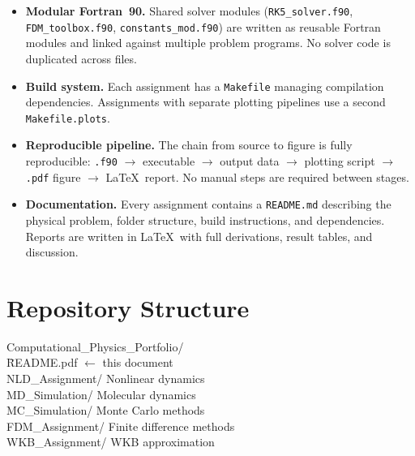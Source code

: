 \documentclass[11pt, a4paper]{article}
\begin{document}
\begin{itemize}[leftmargin=1.4em, itemsep=0.3em]

  \item \textbf{Modular Fortran~90.}
  Shared solver modules (\texttt{RK5\_solver.f90}, \texttt{FDM\_toolbox.f90},
  \texttt{constants\_mod.f90}) are written as reusable Fortran modules and
  linked against multiple problem programs. No solver code is duplicated across
  files.

  \item \textbf{Build system.}
  Each assignment has a \texttt{Makefile} managing compilation dependencies.
  Assignments with separate plotting pipelines use a second
  \texttt{Makefile.plots}.

  \item \textbf{Reproducible pipeline.}
  The chain from source to figure is fully reproducible:
  \texttt{.f90} $\to$ executable $\to$ output data $\to$ plotting script
  $\to$ \texttt{.pdf} figure $\to$ \LaTeX\ report. No manual steps are
  required between stages.

  \item \textbf{Documentation.}
  Every assignment contains a \texttt{README.md} describing the physical
  problem, folder structure, build instructions, and dependencies.
  Reports are written in \LaTeX\ with full derivations, result tables,
  and discussion.

\end{itemize}

\section{Repository Structure}

\begin{infobox}
\ttfamily\small
\begin{tabbing}
Computational\_Physics\_Portfolio/ \\
\hspace{1.5em}\=README.pdf \hspace{3em} \=\textrm{$\leftarrow$ this document}\\
\>NLD\_Assignment/ \>\textrm{Nonlinear dynamics}\\
\>MD\_Simulation/ \>\textrm{Molecular dynamics}\\
\>MC\_Simulation/ \>\textrm{Monte Carlo methods}\\
\>FDM\_Assignment/ \>\textrm{Finite difference methods}\\
\>WKB\_Assignment/ \>\textrm{WKB approximation}\\
\end{tabbing}
\end{infobox}
\end{document}
